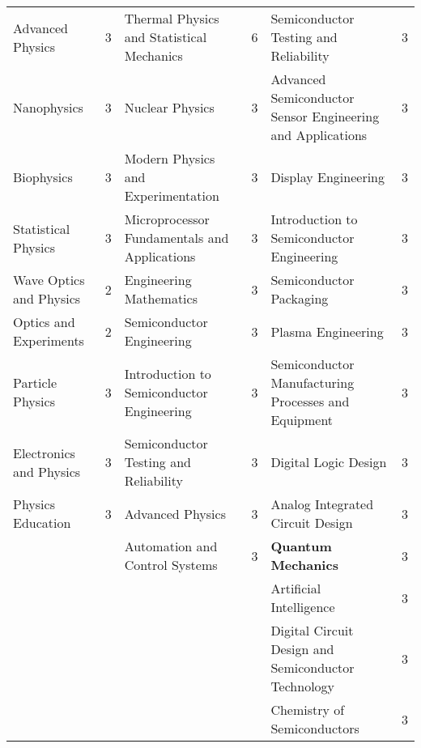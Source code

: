 \documentclass{bmcart}
\begin{document}
\begin{landscape}
\begin{longtable}{p{3.5cm}|p{1cm}|p{7cm}|p{1cm}|p{7cm}|p{1cm}}
\scriptsize Advanced Physics & \scriptsize 3 & \scriptsize Thermal Physics and \newline Statistical Mechanics & \scriptsize 6 & \scriptsize Semiconductor Testing and Reliability & \scriptsize 3 \\
\scriptsize Nanophysics & \scriptsize 3 & \scriptsize Nuclear Physics & \scriptsize 3 & \scriptsize Advanced Semiconductor \newline Sensor Engineering and Applications & \scriptsize 3 \\
\scriptsize Biophysics & \scriptsize 3 & \scriptsize Modern Physics and Experimentation & \scriptsize 3 & \scriptsize Display Engineering & \scriptsize 3 \\
\scriptsize Statistical Physics & \scriptsize 3 & \scriptsize Microprocessor Fundamentals and Applications & \scriptsize 3 & \scriptsize Introduction to Semiconductor Engineering & \scriptsize 3 \\
\scriptsize Wave Optics and Physics & \scriptsize 2 & \scriptsize Engineering Mathematics & \scriptsize 3 & \scriptsize Semiconductor Packaging & \scriptsize 3 \\
\scriptsize Optics and Experiments & \scriptsize 2 & \scriptsize Semiconductor Engineering & \scriptsize 3 & \scriptsize Plasma Engineering & \scriptsize 3 \\
\scriptsize Particle Physics & \scriptsize 3 & \scriptsize Introduction to Semiconductor Engineering & \scriptsize 3 & \scriptsize Semiconductor Manufacturing Processes and Equipment & \scriptsize 3 \\
\scriptsize Electronics and Physics & \scriptsize 3 & \scriptsize Semiconductor Testing and Reliability & \scriptsize 3 & \scriptsize Digital Logic Design & \scriptsize 3 \\
\scriptsize Physics Education & \scriptsize 3 & \scriptsize Advanced Physics & \scriptsize 3 & \scriptsize Analog Integrated Circuit Design & \scriptsize 3 \\
 &  & \scriptsize Automation and Control Systems & \scriptsize 3 & \scriptsize \textbf{Quantum Mechanics} & \scriptsize 3 \\
 &  &  &  & \scriptsize Artificial Intelligence & \scriptsize 3 \\
 &  &  &  & \scriptsize Digital Circuit Design \newline and Semiconductor Technology & \scriptsize 3 \\
 &  &  &  & \scriptsize Chemistry of Semiconductors & \scriptsize 3 \\
\hline\hline
\end{longtable}


\end{landscape}
\end{document}
